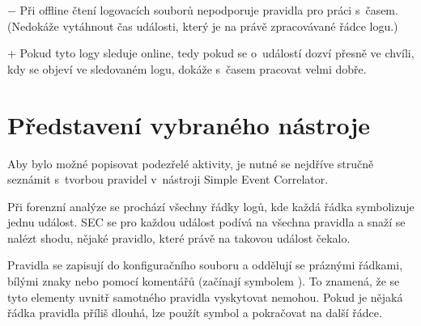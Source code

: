 \documentclass[thesis=B,czech]{FITthesis}[2012/06/26]
\begin{document}
\label{SECMinus}	
$-$ Při offline čtení logovacích souborů nepodporuje pravidla pro práci s~časem. (Nedokáže vytáhnout čas události, který je na právě zpracovávané řádce logu.) 

+ Pokud tyto logy sleduje online, tedy pokud se o~událostí dozví přesně ve chvíli, kdy se objeví ve sledovaném logu, dokáže s~časem pracovat velmi dobře.

\section{Představení vybraného nástroje}
Aby bylo možné popisovat podezřelé aktivity, je nutné se nejdříve stručně seznámit s~tvorbou pravidel v~nástroji Simple Event Correlator. 

Při forenzní analýze se prochází všechny řádky logů, kde každá řádka symbolizuje jednu událost. SEC se pro každou událost podívá na všechna pravidla a snaží se nalézt shodu, nějaké pravidlo, které právě na takovou událost čekalo.

Pravidla se zapisují do konfiguračního souboru a oddělují se práznými řádkami, bílými znaky nebo pomocí komentářů (začínají symbolem \uv{\#}). To znamená, že se tyto elementy uvnitř samotného pravidla vyskytovat nemohou. Pokud je nějaká řádka pravidla příliš dlouhá, lze použít symbol \uv{\textbackslash} a pokračovat na další řádce. \cite{secManPage}
\end{document}
